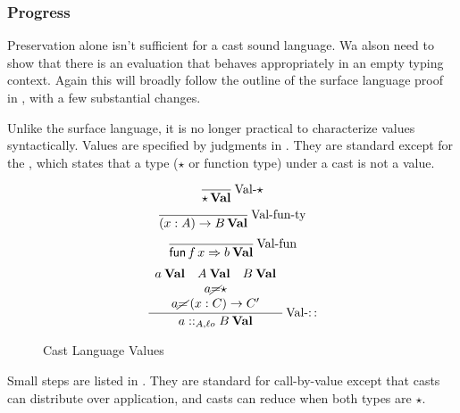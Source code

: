  
\subsubsection{Progress}
 
Preservation alone isn't sufficient for a cast sound language.
Wa alson need to show that there is an evaluation that behaves appropriately in an empty typing context.
Again this will broadly follow the outline of the surface language proof in , with a few substantial changes.
 
Unlike the surface language, it is no longer practical to characterize values syntactically.
Values are specified by judgments in .
They are standard except for the , which states that a type ($\star$ or function type) under a cast is not a value.
 
\begin{figure}
\[
\frac{\,}{\star\,\textbf{Val}}
\operatorname{Val-\star}
\]
\[
\frac{\,}{\left(x:A\right)\rightarrow B\,\textbf{Val}}
\operatorname{Val-fun-ty}
\]
\[
\frac{\,}{\mathsf{fun}\,f\,x\Rightarrow b\:\textbf{Val}}
\operatorname{Val-fun}
\]
\[
\frac{\begin{array}{c}
a\:\textbf{Val}\quad A\:\textbf{Val}\quad B\:\textbf{Val}\\
a\cancel{=}\star\\
a\cancel{=}\left(x:C\right)\rightarrow C'
\end{array}}{a::_{A,\ell o}B\:\textbf{Val}}
\operatorname{Val-::}
\]
\caption{Cast Language Values}
\label{fig:cast-val}
\end{figure}
 
Small steps are listed in .
They are standard for call-by-value except that casts can distribute over application, and casts can reduce when both types are $\star$.
 
